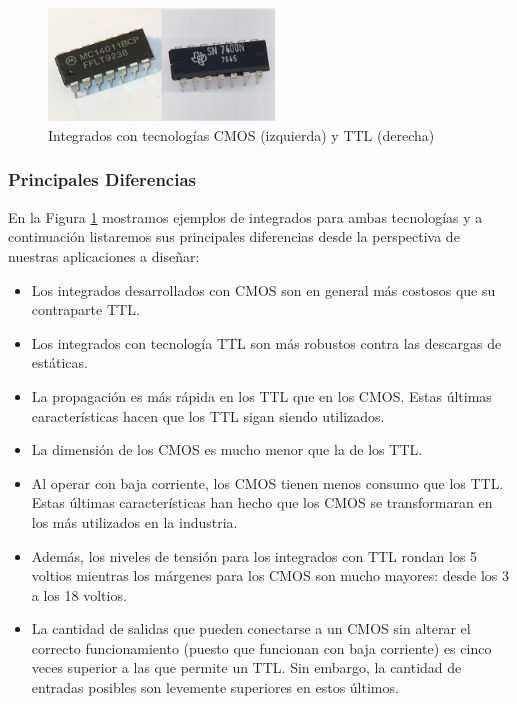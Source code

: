 \documentclass[a4paper]{article}
\begin{document}
\begin{figure}[h]\centering
    \includegraphics[height=3cm]{transistores.png}
    \caption{Integrados con tecnologías CMOS (izquierda) y TTL 
    (derecha)}\label{fig:transistores}
\end{figure}

\subsubsection*{Principales Diferencias}

En la Figura \ref{fig:transistores} mostramos ejemplos de integrados 
para ambas tecnologías y a continuación listaremos sus principales 
diferencias desde la perspectiva de nuestras aplicaciones a diseñar:

\begin{itemize}
    \item {
        Los integrados desarrollados con CMOS son en general más 
        costosos que su contraparte TTL.
    }
    \item {
        Los integrados con tecnología TTL son más robustos contra
        las descargas de estáticas.
    }
    \item {
        La propagación es más rápida en los TTL que en los CMOS. 
        Estas últimas características hacen que los TTL sigan siendo
        utilizados.
    }    
    \item {
        La dimensión de los CMOS es mucho menor que la de los TTL.
    }
    \item {
        Al operar con baja corriente, los CMOS tienen menos consumo 
        que los TTL. Estas últimas características han hecho que los 
        CMOS se transformaran en los más utilizados en la industria.
    }
    \item {
        Además, los niveles de tensión para los integrados con TTL 
        rondan los 5 voltios mientras los márgenes para los CMOS son
        mucho mayores: desde los 3 a los 18 voltios.
    }
    \item {
        La cantidad de salidas que pueden conectarse a un CMOS sin 
        alterar el correcto funcionamiento (puesto que funcionan con
        baja corriente) es cinco veces superior a las que permite un 
        TTL. Sin embargo, la cantidad de entradas posibles son 
        levemente superiores en estos últimos.
    }

\end{itemize}
\end{document}
